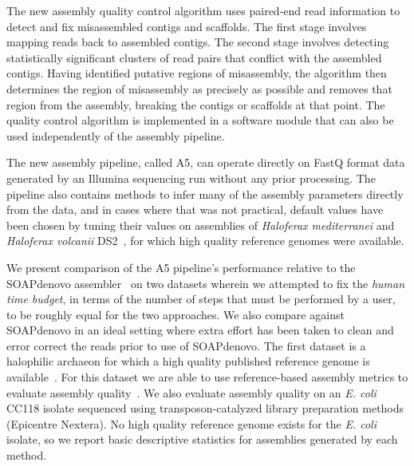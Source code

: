 \documentclass[10pt]{article}
\begin{document}
The new assembly quality control algorithm uses paired-end read information
to detect and fix misassembled contigs and scaffolds. The first stage involves mapping reads back to assembled contigs.
The second stage involves detecting statistically significant clusters of read pairs that conflict with the
assembled contigs. Having identified putative regions of misassembly, the algorithm then determines the 
region of misassembly as precisely as possible and removes that region from the assembly, breaking the contigs
or scaffolds at that point. The quality control algorithm is implemented in a software module that can also be used 
independently of the assembly pipeline.

The new assembly pipeline, called A5, can operate directly on FastQ format data generated by an Illumina sequencing run
without any prior processing. The pipeline also contains methods to infer many of the assembly parameters directly
from the data, and in cases where that was not practical, default values have been chosen by tuning their values on 
assemblies of \textit{Haloferax mediterranei} and \textit{Haloferax volcanii} DS2~\cite{Hartman2010}, for which high quality reference genomes were available.

We present comparison of the A5 pipeline's performance relative to the SOAPdenovo assembler~\cite{Li2010} on two datasets wherein we attempted to fix the \textit{human time budget}, in terms of the number of steps that must be performed by a user, to be roughly equal for the two approaches. We also compare against SOAPdenovo in an ideal setting where extra effort has been taken to clean and error correct the reads prior to use of SOAPdenovo.
The first dataset
is a halophilic archaeon for which a high quality published reference genome is available~\cite{Hartman2010}. For this dataset we are able to use
reference-based assembly metrics to evaluate assembly quality~\cite{Darling2011}. We also evaluate assembly quality on an 
\textit{E. coli} CC118 isolate sequenced using transposon-catalyzed library preparation methods (Epicentre Nextera). 
No high quality reference genome exists for the \textit{E. coli} isolate, so we report basic descriptive statistics for assemblies
generated by each method.
\end{document}
